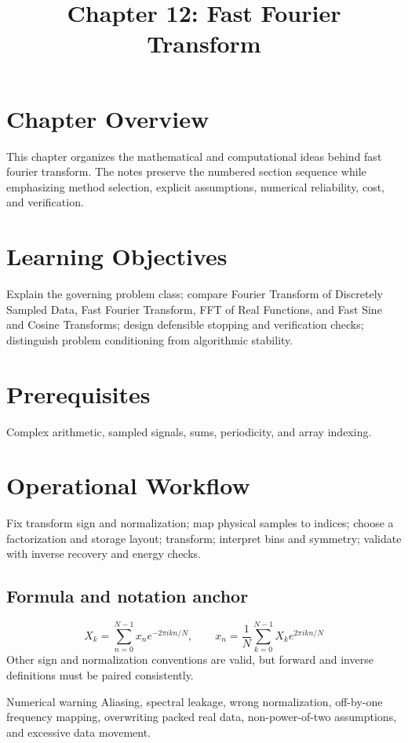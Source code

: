 \documentclass[10pt,letterpaper]{article}
\title{Chapter 12: Fast Fourier Transform}
\author{}
\date{}
\begin{document}
\maketitle

\section*{Chapter Overview}
This chapter organizes the mathematical and computational ideas behind fast fourier transform. The notes preserve the numbered section sequence while emphasizing method selection, explicit assumptions, numerical reliability, cost, and verification.

\section*{Learning Objectives}
Explain the governing problem class; compare Fourier Transform of Discretely Sampled Data, Fast Fourier Transform, FFT of Real Functions, and Fast Sine and Cosine Transforms; design defensible stopping and verification checks; distinguish problem conditioning from algorithmic stability.

\section*{Prerequisites}
Complex arithmetic, sampled signals, sums, periodicity, and array indexing.

\section*{Operational Workflow}
Fix transform sign and normalization; map physical samples to indices; choose a factorization and storage layout; transform; interpret bins and symmetry; validate with inverse recovery and energy checks.

\subsection*{Formula and notation anchor}
\[
X_k=\sum_{n=0}^{N-1}x_n e^{-2\pi i kn/N},\qquad x_n=\frac1N\sum_{k=0}^{N-1}X_k e^{2\pi i kn/N}
\]
Other sign and normalization conventions are valid, but forward and inverse definitions must be paired consistently.

\begin{warnbox}{Numerical warning}
Aliasing, spectral leakage, wrong normalization, off-by-one frequency mapping, overwriting packed real data, non-power-of-two assumptions, and excessive data movement.
\end{warnbox}
\end{document}
